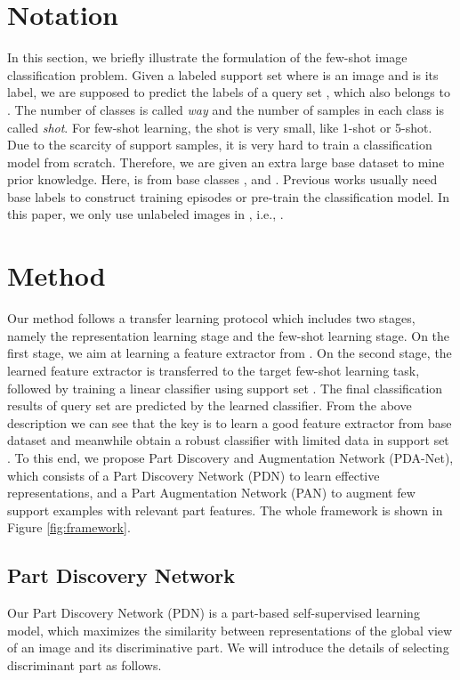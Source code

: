 \documentclass{article}
\begin{document}
\section{Notation}
In this section, we briefly illustrate the formulation of the few-shot image classification problem. Given a labeled support set  where  is an image and  is its label, we are supposed to predict the labels of a query set , which also belongs to . The number of classes  is called \emph{way} and the number of samples in each class is called \emph{shot}. For few-shot learning, the shot is very small, like 1-shot or 5-shot. Due to the scarcity of support samples, it is very hard to train a classification model from scratch. Therefore, we are given an extra large base dataset  to mine prior knowledge. Here,  is from base classes , and . Previous works usually need base labels to construct training episodes or pre-train the classification model. In this paper, we only use unlabeled images in , i.e., . 



\section{Method}
Our method follows a transfer learning protocol which includes two stages, namely the representation learning stage and the few-shot learning stage. On the first stage, we aim at learning a feature extractor  from .
On the second stage, the learned feature extractor  is transferred to the target few-shot learning task, followed by training a linear classifier 
using support set . The final classification results of query set  are predicted by the learned classifier. From the above description we can see that the key is to learn a good feature extractor from base dataset  and meanwhile obtain a robust classifier with limited data in support set . To this end, we propose Part Discovery and Augmentation Network (PDA-Net), which consists of a Part Discovery Network (PDN) to learn effective representations, and a Part Augmentation Network (PAN) to augment few support examples with relevant part features. The whole framework is shown in Figure \ref{fig:framework}.




\subsection{Part Discovery Network}\label{pdn}


Our Part Discovery Network (PDN) is a part-based self-supervised learning model, which maximizes the similarity between representations of the global view of an image and its discriminative part. We will introduce the details of selecting discriminant part as follows.
\end{document}
